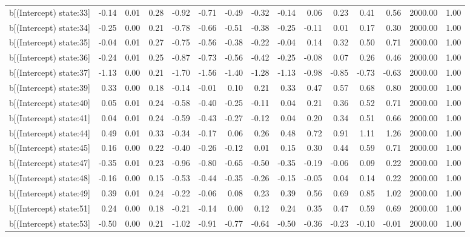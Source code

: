 \begin{table}[ht]
\begin{tabular}{rrrrrrrrrrrrrrr}
  b[(Intercept) state:33] & -0.14 & 0.01 & 0.28 & -0.92 & -0.71 & -0.49 & -0.32 & -0.14 & 0.06 & 0.23 & 0.41 & 0.56 & 2000.00 & 1.00 \\ 
  b[(Intercept) state:34] & -0.25 & 0.00 & 0.21 & -0.78 & -0.66 & -0.51 & -0.38 & -0.25 & -0.11 & 0.01 & 0.17 & 0.30 & 2000.00 & 1.00 \\ 
  b[(Intercept) state:35] & -0.04 & 0.01 & 0.27 & -0.75 & -0.56 & -0.38 & -0.22 & -0.04 & 0.14 & 0.32 & 0.50 & 0.71 & 2000.00 & 1.00 \\ 
  b[(Intercept) state:36] & -0.24 & 0.01 & 0.25 & -0.87 & -0.73 & -0.56 & -0.42 & -0.25 & -0.08 & 0.07 & 0.26 & 0.46 & 2000.00 & 1.00 \\ 
  b[(Intercept) state:37] & -1.13 & 0.00 & 0.21 & -1.70 & -1.56 & -1.40 & -1.28 & -1.13 & -0.98 & -0.85 & -0.73 & -0.63 & 2000.00 & 1.00 \\ 
  b[(Intercept) state:39] & 0.33 & 0.00 & 0.18 & -0.14 & -0.01 & 0.10 & 0.21 & 0.33 & 0.47 & 0.57 & 0.68 & 0.80 & 2000.00 & 1.00 \\ 
  b[(Intercept) state:40] & 0.05 & 0.01 & 0.24 & -0.58 & -0.40 & -0.25 & -0.11 & 0.04 & 0.21 & 0.36 & 0.52 & 0.71 & 2000.00 & 1.00 \\ 
  b[(Intercept) state:41] & 0.04 & 0.01 & 0.24 & -0.59 & -0.43 & -0.27 & -0.12 & 0.04 & 0.20 & 0.34 & 0.51 & 0.66 & 2000.00 & 1.00 \\ 
  b[(Intercept) state:44] & 0.49 & 0.01 & 0.33 & -0.34 & -0.17 & 0.06 & 0.26 & 0.48 & 0.72 & 0.91 & 1.11 & 1.26 & 2000.00 & 1.00 \\ 
  b[(Intercept) state:45] & 0.16 & 0.00 & 0.22 & -0.40 & -0.26 & -0.12 & 0.01 & 0.15 & 0.30 & 0.44 & 0.59 & 0.71 & 2000.00 & 1.00 \\ 
  b[(Intercept) state:47] & -0.35 & 0.01 & 0.23 & -0.96 & -0.80 & -0.65 & -0.50 & -0.35 & -0.19 & -0.06 & 0.09 & 0.22 & 2000.00 & 1.00 \\ 
  b[(Intercept) state:48] & -0.16 & 0.00 & 0.15 & -0.53 & -0.44 & -0.35 & -0.26 & -0.15 & -0.05 & 0.04 & 0.14 & 0.22 & 2000.00 & 1.00 \\ 
  b[(Intercept) state:49] & 0.39 & 0.01 & 0.24 & -0.22 & -0.06 & 0.08 & 0.23 & 0.39 & 0.56 & 0.69 & 0.85 & 1.02 & 2000.00 & 1.00 \\ 
  b[(Intercept) state:51] & 0.24 & 0.00 & 0.18 & -0.21 & -0.14 & 0.00 & 0.12 & 0.24 & 0.35 & 0.47 & 0.59 & 0.69 & 2000.00 & 1.00 \\ 
  b[(Intercept) state:53] & -0.50 & 0.00 & 0.21 & -1.02 & -0.91 & -0.77 & -0.64 & -0.50 & -0.36 & -0.23 & -0.10 & -0.01 & 2000.00 & 1.00 \\ 

\end{tabular}
\end{table}
